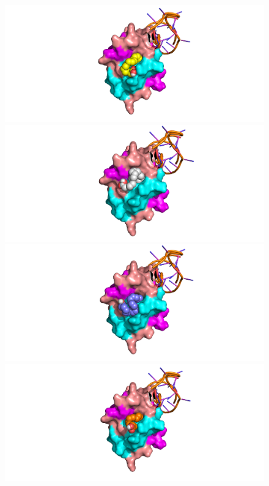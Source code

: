 \begin{figure}[htbp!]
        \includegraphics[trim={6.5cm 0 5.5cm 0},clip,width=\linewidth]{assets/RRM1_orig_linoleic.png}
    \endminipage\hfill
        \includegraphics[trim={6.5cm 0 7cm 0},clip,width=\linewidth]{assets/RRM1_orig_stearic.png}
    \endminipage\\
        \includegraphics[trim={6.5cm 0 6.5cm 0},clip,width=\linewidth]{assets/RRM1_orig_arachidonic.png}
    \endminipage\hfill
        \includegraphics[trim={6.5cm 0 5.5cm 0},clip,width=\linewidth]{assets/RRM1_orig_palmitic.png}

\end{figure}
